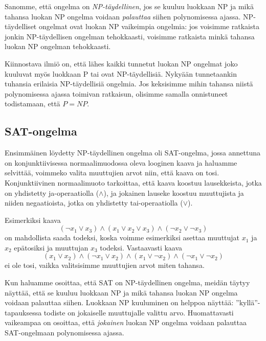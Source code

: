 Sanomme, että ongelma on \emph{NP-täydellinen},
jos se kuuluu luokkaan NP ja mikä tahansa luokan NP
ongelma voidaan \emph{palauttaa} siihen polynomisessa ajassa.
NP-täydelliset ongelmat ovat luokan NP vaikeimpia ongelmia:
jos voisimme ratkaista jonkin NP-täydellisen ongelman tehokkaasti,
voisimme ratkaista minkä tahansa luokan NP ongelman tehokkaasti.

Kiinnostava ilmiö on, että lähes kaikki tunnetut luokan NP
ongelmat joko kuuluvat myös luokkaan P tai ovat
NP-täydellisiä.
Nykyään tunnetaankin tuhansia erilaisia NP-täydellisiä ongelmia.
Jos keksisimme mihin tahansa niistä polynomisessa ajassa toimivan
ratkaisun, olisimme samalla onnistuneet todistamaan, että $P=NP$.

\subsection{SAT-ongelma}

Ensimmäinen löydetty NP-täydellinen ongelma oli
SAT-ongelma, jossa annettuna on konjunktiivisessa
normaalimuodossa oleva looginen kaava ja haluamme
selvittää, voimmeko valita muuttujien arvot niin,
että kaava on tosi.
Konjunktiivinen normaalimuoto tarkoittaa,
että kaava koostuu lausekkeista, jotka on yhdistetty
ja-operaatiolla ($\land$), ja jokainen lauseke koostuu
muuttujista ja niiden negaatioista, jotka on yhdistetty
tai-operaatiolla ($\lor$).

Esimerkiksi kaava
\[(\neg x_1 \lor x_3) \land (x_1 \lor x_2 \lor x_3) \land (\neg x_2 \lor \neg x_3)\]
on mahdollista saada todeksi, koska voimme esimerkiksi asettaa
muuttujat $x_1$ ja $x_2$ epätosiksi ja muuttujan $x_3$ todeksi.
Vastaavasti kaava
\[(x_1 \lor x_2) \land (\neg x_1 \lor x_2) \land (x_1 \lor \neg x_2) \land (\neg x_1 \lor \neg x_2) \]
ei ole tosi, vaikka valitsisimme muuttujien arvot miten tahansa.

Kun haluamme osoittaa, että SAT on NP-täydellinen ongelma,
meidän täytyy näyttää, että se kuuluu luokkaan NP ja mikä
tahansa luokan NP ongelma voidaan palauttaa siihen.
Luokkaan NP kuuluminen on helppoa näyttää:
''kyllä''-tapauksessa todiste on jokaiselle muuttujalle valittu arvo.
Huomattavasti vaikeampaa on osoittaa, että \emph{jokainen} luokan
NP ongelma voidaan palauttaa SAT-ongelmaan polynomisessa ajassa.

